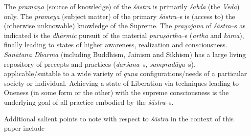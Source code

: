 \vskip 2pt

The \textit{pramāṇa} (source of knowledge) of the \textit{śāstra} is primarily \textit{śabda} (the \textit{Veda}) only. The \textit{prameya} (subject matter) of the primary \textit{śāstra}–s is (access to) the (otherwise unknowable) knowledge of the Supreme. The \textit{prayojana} of \textit{śāstra}–s as indicated is the \textit{dhārmic} pursuit of the material \textit{puruṣārtha}–s (\textit{artha} and \textit{kāma}), finally leading to states of higher awareness, realization and consciousness. \textit{Sanātana Dharma} (including Buddhism, Jainism and Sikhism) has a large living repository of precepts and practices (\textit{darśana}–s, \textit{sampradāya}–s), applicable/suitable to a wide variety of \textit{guṇa} configurations/needs of a particular society or individual. Achieving a state of Liberation via techniques leading to Oneness (in some form or the other) with the supreme consciousness is the underlying goal of all practice embodied by the \textit{śāstra}–s.

\vskip 2pt

\vskip 2pt

Additional salient points to note with respect to \textit{śāstra} in the context of this paper include

\vskip 2pt

